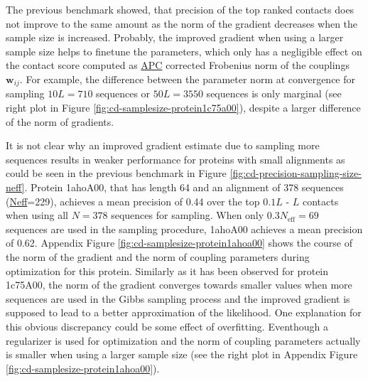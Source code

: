 \documentclass[11pt,a4paper,twoside]{book}
\newcommand{\eq}{\!=\!}
\newcommand{\wij}{\mathbf{w}_{ij}}
\theoremstyle{definition}
\theoremstyle{definition}
\theoremstyle{remark}
\begin{document}
The previous benchmark showed, that precision of the top ranked contacts
does not improve to the same amount as the norm of the gradient
decreases when the sample size is increased. Probably, the improved
gradient when using a larger sample size helps to finetune the
parameters, which only has a negligible effect on the contact score
computed as \protect\hyperlink{abbrev}{APC} corrected Frobenius norm of
the couplings \(\wij\). For example, the difference between the
parameter norm at convergence for sampling \(10L = 710\) sequences or
\(50L = 3550\) sequences is only marginal (see right plot in Figure
\ref{fig:cd-samplesize-protein1c75a00}), despite a larger difference of
the norm of gradients.

It is not clear why an improved gradient estimate due to sampling more
sequences results in weaker performance for proteins with small
alignments as could be seen in the previous benchmark in Figure
\ref{fig:cd-precision-sampling-size-neff}. Protein 1ahoA00, that has
length 64 and an alignment of 378 sequences
(\protect\hyperlink{abbrev}{Neff}=229), achieves a mean precision of
0.44 over the top \(0.1L\) - \(L\) contacts when using all \(N \eq 378\)
sequences for sampling. When only \(0.3N_{\textrm{eff}} \eq 69\)
sequences are used in the sampling procedure, 1ahoA00 achieves a mean
precision of 0.62. Appendix Figure
\ref{fig:cd-samplesize-protein1ahoa00} shows the course of the norm of
the gradient and the norm of coupling parameters during optimization for
this protein. Similarly as it has been observed for protein 1c75A00, the
norm of the gradient converges towards smaller values when more
sequences are used in the Gibbs sampling process and the improved
gradient is supposed to lead to a better approximation of the
likelihood. One explanation for this obvious discrepancy could be some
effect of overfitting. Eventhough a regularizer is used for optimization
and the norm of coupling parameters actually is smaller when using a
larger sample size (see the right plot in Appendix Figure
\ref{fig:cd-samplesize-protein1ahoa00}).
\end{document}
